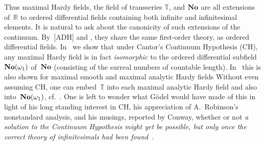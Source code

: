 \documentclass[]{amsart}
\numberwithin{equation}{section}
\newcommand{\bbold}{\mathbb}
\def\R { {\bbold R} }
\def\T { {\bbold T} }
\def \Ex{\operatorname{E}}
\theoremstyle{definition}
\theoremstyle{remark}
\def \No{\text{{\bf No}}}
\begin{document}
Thus maximal Hardy fields, the field of transseries $\T$, and $\No$ are all extensions of~$\R$ to
ordered differential fields containing both infinite and infinitesimal  elements. 
It is natural to ask about the canonicity of such extensions of the continuum. By~[ADH] and \cite{ADH1+,ADH2}, they share the same first-order theory, as ordered differential fields.
In~\cite{ADH6}  we show that under Cantor's Continuum Hypothesis (CH), any maximal Hardy field is in fact {\it isomorphic}\/ to
the ordered differential subfield~$\No(\omega_1)$ of~$\No$  (consisting of  the surreal numbers of countable length).
In~\cite{AvdD} this is also shown 
for maximal smooth   and maximal analytic Hardy fields
Without even assuming CH, 
one can  embed~$\T$ into each maximal analytic Hardy field and also into~$\No(\omega_1)$, cf.~\cite{AvdD,ADH1+}.
One is left to wonder what G\"odel would have made of this in light of his long standing interest in CH, his appreciation of A.~Robinson's nonstandard analysis, and his  musings,  reported by Conway, whether or not {\it  a solution to the Continuum Hypothesis might yet be possible, but only once the correct theory of infinitesimals had been found}\/~\cite[pp.~209--213]{Roberts}.
\end{document}
